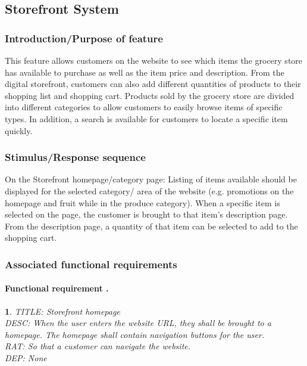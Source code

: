 \documentclass{scrreprt}
\theoremstyle{funreq}
\newtheorem{funreq}{}
\begin{document}
	
	\subsection{Storefront System}
	\subsubsection{Introduction/Purpose of feature}
	This feature allows customers on the website to see which items the grocery store has available to purchase as well as the item price and description.  From the digital storefront, customers can also add different quantities of products to their shopping list and shopping cart.  Products sold by the grocery store are divided into different categories to allow customers to easily browse items of specific types.  In addition, a search is available for customers to locate a specific item quickly.
	\subsubsection{Stimulus/Response sequence}
	On the Storefront homepage/category page: Listing of items available should be displayed for the selected category/ area of the website (e.g. promotions on the homepage and fruit while in the produce category).  When a specific item is selected on the page, the customer is brought to that item’s description page.  From the description page, a quantity of that item can be selected to add to the shopping cart.  
	\subsubsection{Associated functional requirements}
	
	\paragraph[]{Functional requirement .}
	\begin{funreq}
		\label{store_home}
		TITLE: Storefront homepage\\
		DESC: When the user enters the website URL, they shall be brought to a homepage.  The homepage shall contain navigation buttons for the user.\\
		RAT: So that a customer can navigate the website.\\
		DEP: None\\
	\end{funreq}
	
\end{document}
